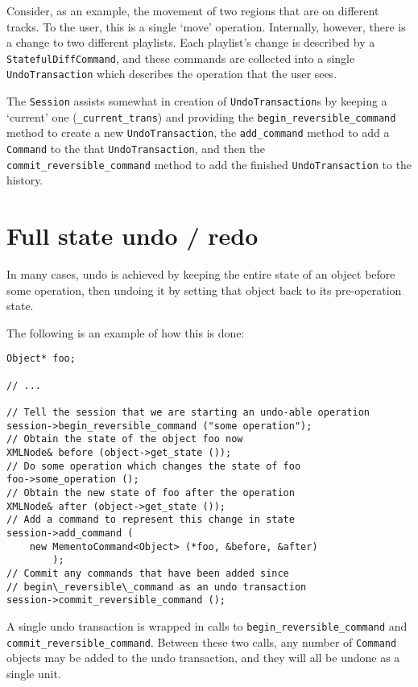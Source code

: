\documentclass[10pt,a4paper]{book}
\newcommand{\code}[1]{\texttt{#1}}
\begin{document}
Consider, as an example, the movement of two regions that are on
different tracks.  To the user, this is a single `move' operation.
Internally, however, there is a change to two different playlists.
Each playlist's change is described by a \code{StatefulDiffCommand},
and these commands are collected into a single \code{UndoTransaction}
which describes the operation that the user sees.

The \code{Session} assists somewhat in creation of
\code{UndoTransaction}s by keeping a `current' one
(\code{\_current\_trans}) and providing the
\code{begin\_reversible\_command} method to create a new
\code{UndoTransaction}, the \code{add\_command} method to add a
\code{Command} to the that \code{UndoTransaction}, and then the
\code{commit\_reversible\_command} method to add the finished
\code{UndoTransaction} to the history.


\section{Full state undo / redo}

In many cases, undo is achieved by keeping the entire state of an
object before some operation, then undoing it by setting that object
back to its pre-operation state.

The following is an example of how this is done:

\begin{lstlisting}
Object* foo;

// ...

// Tell the session that we are starting an undo-able operation
session->begin_reversible_command ("some operation");
// Obtain the state of the object foo now
XMLNode& before (object->get_state ());
// Do some operation which changes the state of foo
foo->some_operation ();
// Obtain the new state of foo after the operation
XMLNode& after (object->get_state ());
// Add a command to represent this change in state
session->add_command (
	new MementoCommand<Object> (*foo, &before, &after)
        );
// Commit any commands that have been added since
// begin\_reversible\_command as an undo transaction
session->commit_reversible_command ();
\end{lstlisting}

A single undo transaction is wrapped in calls to
\code{begin\_reversible\_command} and
\code{commit\_reversible\_command}.  Between these two calls, any
number of \code{Command} objects may be added to the undo transaction,
and they will all be undone as a single unit.
\end{document}
